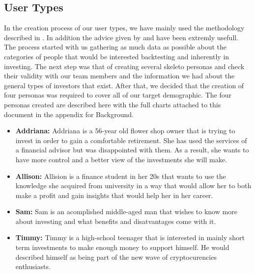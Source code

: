 \documentclass[main.tex]{subfiles}
\begin{document}
\subsection{User Types}
In the creation process of our user types, we have mainly used the methodology described in \cite{pathy}. In addition the advice given by \cite{uiux_fundation} and \cite{user_types_interaction_design_fundation} have been extremly usefull. The process started with us gathering as much data as possible about the categories of people that would be interested backtesting and inherently in investing. The next step was that of creating several skeleto personas \cite{personas} and check their validity with our team members and the information we had about the general types of investors that exist. After that, we decided that the creation of four personas  was required to cover all of our target demographic. 
The four personas created are described here with the full charts attached to this document in the appendix for Background.
\begin{itemize}
\item \textbf{Addriana: }Addriana is a 56-year old flower shop owner that is trying to invest in order to gain a comfortable retirement. She has used the services of a financial advisor but was disappointed with them. As a result, she wants to have more control and a better view of the investments she will make.
\item \textbf{Allison: }Allision is a finance student in her 20s that wants to use the knowledge she acquired from university in a way that would allow her to both make a profit and gain insights that would help her in her career.
\item\textbf{Sam: }Sam is an acomplished middle-aged man that wishes to know more about investing and what benefits and disatvantages come with it. 
\item\textbf{Timmy: }Timmy is a high-school teenager that is interested in mainly short term investments to make enough money to support himself. He would described himself as being part of the new wave of cryptocurencies enthusiasts.
\end{itemize}
\end{document}
